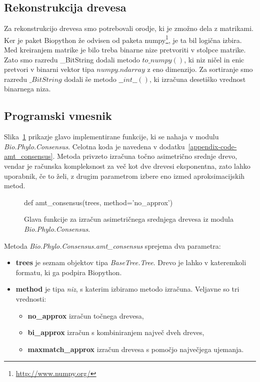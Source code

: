 \documentclass[a4paper, 12pt]{book}
\begin{document}
\subsection{Rekonstrukcija drevesa}
Za rekonstrukcijo drevesa smo potrebovali orodje, ki je zmožno dela z matrikami. 
Ker je paket Biopython že odvisen od paketa numpy\footnote{\url{http://www.numpy.org/}},
je ta bil logična izbira. Med kreiranjem matrike je bilo treba binarne nize 
pretvoriti v stolpce matrike. Zato smo razredu \_BitString dodali metodo 
$to\_numpy()$, ki niz ničel in enic pretvori v binarni vektor tipa 
$numpy.ndarray$ z eno dimenzijo. Za sortiranje smo razredu 
$\_BitString$ dodali še metodo $\_\_int\_\_()$, ki izračuna desetiško vrednost 
binarnega niza.

\subsection{Programski vmesnik}

Slika~\ref{code-amt-func} prikazje glavo implementirane funkcije, ki se nahaja v 
modulu {\it Bio.Phylo.Consensus}. Celotna koda je navedena v dodatku~\ref{appendix-code-amt_consensus}.
Metoda privzeto izračuna točno asimetrično srednje
drevo, vendar je računska kompleksnost za več kot dve drevesi eksponentna, zato 
lahko uporabnik, če to želi, z drugim parametrom izbere eno izmed 
aproksimacijskih metod. 

\begin{figure}[h!]
	\begin{python}
		def amt_consensus(trees, method='no_approx')
	\end{python}
	\caption{Glava funkcije za izračun asimetričnega srednjega drevesa iz modula {\it Bio.Phylo.Consensus}.}
	\label{code-amt-func}
\end{figure}

\noindent Metoda {\it Bio.Phylo.Consensus.amt\_consensus}
sprejema dva parametra:

\begin{itemize}
\item {\bf trees} je seznam objektov tipa {\it BaseTree.Tree}. Drevo je lahko v kateremkoli formatu, ki ga podpira Biopython.

\item {\bf method} je tipa {\it niz}, s katerim izbiramo metodo izračuna. Veljavne so tri vrednosti:

\begin{itemize}
    \item {\bf no\_approx} izračun točnega drevesa,

    \item {\bf bi\_approx} izračun s kombiniranjem največ dveh dreves,

    \item {\bf maxmatch\_approx} izračun drevesa s pomočjo največjega ujemanja.
\end{itemize}
\end{itemize}
    
\end{document}
